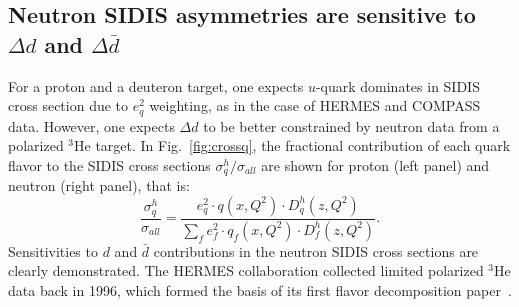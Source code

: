 \subsection{Neutron SIDIS asymmetries are sensitive to $\Delta d$ and $\Delta \bar{d}$}
For a proton and a deuteron target, one expects $u$-quark dominates in SIDIS cross section 
due to $e_q^2$ weighting, as in the case of HERMES and COMPASS data. However,  
one expects $\Delta d$ to be better constrained by neutron data from a polarized $^3$He target.
In Fig.~\ref{fig:crossq}, the fractional contribution of each quark flavor 
to the SIDIS cross sections $\sigma_q^h/\sigma_{all}$ are shown for proton (left panel) and neutron (right panel),
 that is:
\begin{equation}
{\frac{\sigma_q^h}{\sigma_{all}}}= {\frac{e_q^2 \cdot q(x,Q^2) \cdot D_q^h(z,Q^2)} {\sum_f e_f^2 \cdot  q_f(x,Q^2)\cdot D_f^h(z,Q^2)}}.
\end{equation} 
Sensitivities to $d$ and $\bar{d}$ contributions in the neutron SIDIS cross sections are clearly demonstrated.
 The HERMES collaboration collected limited polarized $^3$He data back
in 1996, which formed the basis of its first flavor decomposition paper~\cite{hermes99}.   
